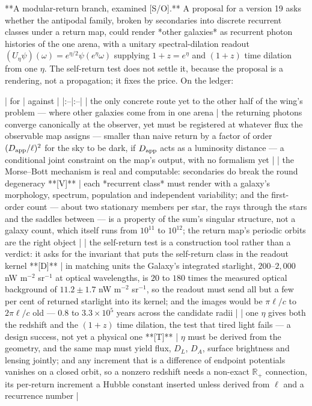 **A modular-return branch, examined [S/O].** A proposal for a version 19 asks whether the antipodal family, broken by secondaries into discrete recurrent classes under a return map, could render *other galaxies* as recurrent photon histories of the one arena, with a unitary spectral-dilation readout $(U_\eta\psi)(\omega) = e^{\eta/2}\psi(e^\eta\omega)$ supplying $1+z = e^\eta$ and $(1+z)$ time dilation from one $\eta$. The self-return test does not settle it, because the proposal is a rendering, not a propagation; it fixes the price. On the ledger:

| for | against |
|:--|:--|
| the only concrete route yet to the other half of the wing's problem — where other galaxies come from in one arena | the returning photons converge canonically at the observer, yet must be registered at whatever flux the observable map assigns — smaller than naive return by a factor of order $(D_{\rm app}/\ell)^2$ for the sky to be dark, if $D_{\rm app}$ acts as a luminosity distance — a conditional joint constraint on the map's output, with no formalism yet |
| the Morse–Bott mechanism is real and computable: secondaries do break the round degeneracy **[V]** | each *recurrent class* must render with a galaxy's morphology, spectrum, population and independent variability; and the first-order count — about two stationary members per star, the rays through the stars and the saddles between — is a property of the sum's singular structure, not a galaxy count, which itself runs from $10^{11}$ to $10^{12}$; the return map's periodic orbits are the right object |
| the self-return test is a construction tool rather than a verdict: it asks for the invariant that puts the self-return class in the readout kernel **[D]** | in matching units the Galaxy's integrated starlight, $200$–$2{,}000$ nW m$^{-2}$ sr$^{-1}$ at optical wavelengths, is $20$ to $180$ times the measured optical background of $11.2\pm1.7$ nW m$^{-2}$ sr$^{-1}$, so the readout must send all but a few per cent of returned starlight into its kernel; and the images would be $\pi\ell/c$ to $2\pi\ell/c$ old — $0.8$ to $3.3\times10^5$ years across the candidate radii |
| one $\eta$ gives both the redshift and the $(1+z)$ time dilation, the test that tired light fails — a design success, not yet a physical one **[T]** | $\eta$ must be derived from the geometry, and the same map must yield flux, $D_L$, $D_A$, surface brightness and lensing jointly; and any increment that is a difference of endpoint potentials vanishes on a closed orbit, so a nonzero redshift needs a non-exact $\mathbb R_+$ connection, its per-return increment a Hubble constant inserted unless derived from $\ell$ and a recurrence number |

